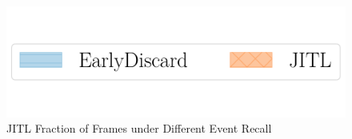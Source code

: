 \begin{figure}
    \centering
    \includegraphics[trim={0 1.8cm 0 0},clip,width=0.7\linewidth]{FIGS/fig-jitl-legend.pdf}
    \hspace*{-0.3in}


\caption{JITL Fraction of Frames under Different Event Recall}
\label{fig:jitl-eventrecall}
\end{figure}
